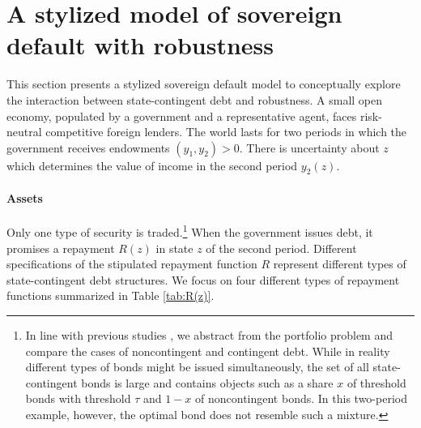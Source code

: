 \section{A stylized model of sovereign default with robustness \label{sec:2permodel}}

This section presents a stylized sovereign default model to conceptually explore the interaction between state-contingent debt and robustness. A small open economy, populated by a government and a representative agent, faces risk-neutral competitive foreign lenders. The world lasts for two periods in which the government receives endowments $(y_1, y_2)>0$. There is uncertainty about $z$ which determines the value of income in the second period $y_2(z)$.

\paragraph{Assets} Only one type of security is traded.\footnote{In line with previous studies \citep{BorenszteinMauro2004, Durdu, HMindexed2012, HMSP16, SandlerisSaprizaTaddei2017, KimOstry2021, SosaPadillaStruzenegger2021}, we abstract from the portfolio problem and compare the cases of noncontingent and contingent debt. While in reality different types of bonds might be issued simultaneously, the set of all state-contingent bonds is large and contains objects such as a share $x$ of threshold bonds with threshold $\tau$ and $1-x$ of noncontingent bonds. In this two-period example, however, the optimal bond does not resemble such a mixture.}
When the government issues debt, it promises a repayment $R(z)$ in state $z$ of the second period. Different specifications of the stipulated repayment function $R$ represent different types of state-contingent debt structures. We focus on four different types of repayment functions summarized in Table \ref{tab:R(z)}.

